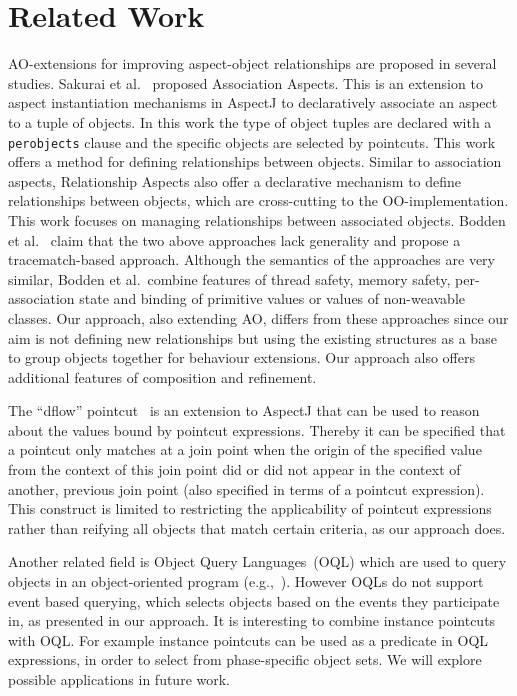 \documentclass[10pt]{sigplanconf}
\newcommand{\lstinln}[1]{\lstinline~#1~}
\begin{document}
\section{Related Work}
AO-extensions for improving aspect-object relationships are proposed in several studies. Sakurai et al.~\cite{sakurai2004association} proposed Association Aspects. This is an extension to aspect instantiation mechanisms in AspectJ to declaratively associate an aspect to a tuple of objects. In this work the type of object tuples are declared with a \lstinln{perobjects} clause and the specific objects are selected by pointcuts. This work offers a method for defining relationships between objects. Similar to association aspects, Relationship Aspects \cite{pearce2006relationship} also offer a declarative mechanism to define relationships between objects, which are cross-cutting to the OO-implementation. This work focuses on managing relationships between associated objects. Bodden et al.~\cite{bodden2008relational} claim that the two above approaches lack generality and propose a tracematch-based approach. Although the semantics of the approaches are very similar, Bodden et al.\ combine features of thread safety, memory safety, per-association state and binding of primitive values or values of non-weavable classes. Our approach, also extending AO, differs from these approaches since our aim is not defining new relationships but using the existing structures as a base to group objects together for behaviour extensions. Our approach also offers additional features of composition and refinement.

The ``dflow'' pointcut~\cite{kawauchi:aosd-aosdsec04} is an extension to AspectJ that can be used to reason about the values bound by pointcut expressions. Thereby it can be specified that a pointcut only matches at a join point when the origin of the specified value from the context of this join point did or did not appear in the context of another, previous join point (also specified in terms of a pointcut expression). This construct is limited to restricting the applicability of pointcut expressions rather than reifying all objects that match certain criteria, as our approach does.

Another related field is Object Query Languages~(OQL) which are used to query objects in an object-oriented program (e.g.,~\cite{cluet1998designing}). However OQLs do not support event based querying, which selects objects based on the events they participate in, as presented in our approach. It is interesting to combine instance pointcuts with OQL. For example instance pointcuts can be used as a predicate in OQL expressions, in order to select from phase-specific object sets. We will explore possible applications in future work.
\end{document}
